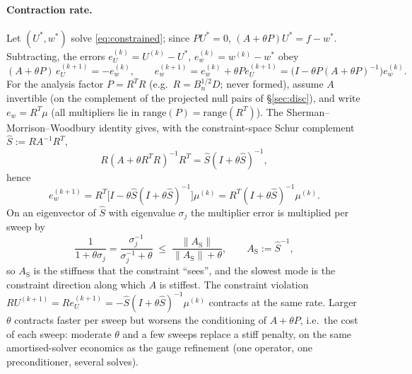 \documentclass[11pt]{article}
\newcommand{\norm}[1]{\lVert #1 \rVert}
\begin{document}
\paragraph{Contraction rate.} Let $(U^*, w^*)$ solve
\eqref{eq:constrained}; since $PU^* = 0$, $(A + \theta P)U^* = f - w^*$.
Subtracting, the errors $e_U^{(k)} = U^{(k)} - U^*$,
$e_w^{(k)} = w^{(k)} - w^*$ obey
\[
  (A + \theta P)\,e_U^{(k+1)} = -e_w^{(k)}, \qquad
  e_w^{(k+1)} = e_w^{(k)} + \theta P e_U^{(k+1)}
  = \bigl(I - \theta P(A + \theta P)^{-1}\bigr)e_w^{(k)} .
\]
For the analysis factor $P = R^{T}R$ (e.g.\ $R = B_n^{1/2}D$; never
formed), assume $A$ invertible (on the complement of the projected null
pairs of \S\ref{sec:disc}), and write $e_w = R^{T}\mu$ (all multipliers
lie in $\mathrm{range}(P) = \mathrm{range}(R^{T})$). The
Sherman--Morrison--Woodbury identity gives, with the constraint-space
Schur complement $\hat S := RA^{-1}R^{T}$,
\begin{equation}
  R(A + \theta R^{T}R)^{-1}R^{T} = \hat S(I + \theta\hat S)^{-1},
  \label{eq:woodbury}
\end{equation}
hence
\begin{equation}
  e_w^{(k+1)} = R^{T}\bigl[I - \theta\hat S(I + \theta\hat S)^{-1}\bigr]\mu^{(k)}
             = R^{T}(I + \theta\hat S)^{-1}\mu^{(k)} .
\end{equation}
On an eigenvector of $\hat S$ with eigenvalue $\sigma_j$ the multiplier
error is multiplied per sweep by
\begin{equation}
  \frac{1}{1 + \theta\sigma_j} = \frac{\sigma_j^{-1}}{\sigma_j^{-1} + \theta}
  \;\le\; \frac{\norm{A_{\mathrm{S}}}}{\norm{A_{\mathrm{S}}} + \theta},
  \qquad A_{\mathrm{S}} := \hat S^{-1},
\end{equation}
so $A_{\mathrm{S}}$ is the stiffness that the constraint ``sees'', and
the slowest mode is the constraint direction along which $A$ is
stiffest. The constraint violation
$RU^{(k+1)} = Re_U^{(k+1)} = -\hat S(I + \theta\hat S)^{-1}\mu^{(k)}$
contracts at the same rate. Larger $\theta$ contracts faster per sweep
but worsens the conditioning of $A + \theta P$, i.e.\ the cost of each
sweep: moderate $\theta$ and a few sweeps replace a stiff penalty, on
the same amortised-solver economics as the gauge refinement (one
operator, one preconditioner, several solves).
\end{document}
